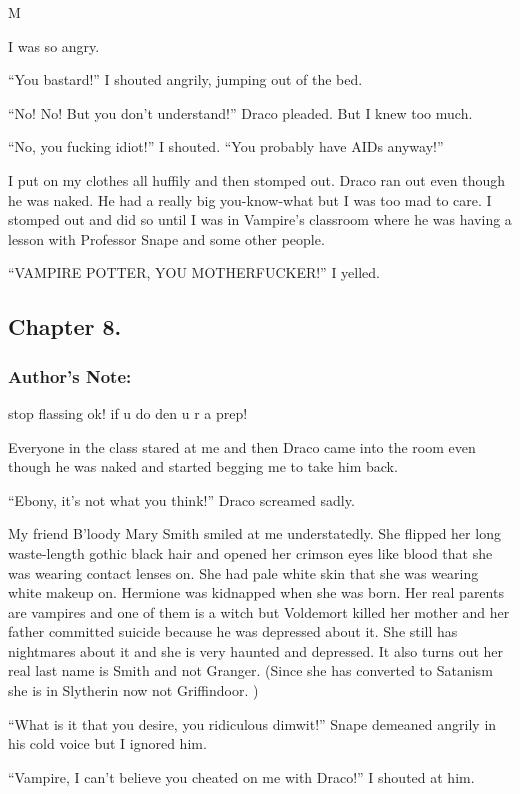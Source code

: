 M\documentclass{article}
\begin{document}
I was so angry.

“You bastard!” I shouted angrily, jumping out of the bed.

“No! No! But you don’t understand!” Draco pleaded. But I knew too much.

“No, you fucking idiot!” I shouted. “You probably have AIDs anyway!”

I put on my clothes all huffily and then stomped out. Draco ran out even though he was naked. He had a really big you-know-what but I was too mad to care. I stomped out and did so until I was in Vampire’s classroom where he was having a lesson with Professor Snape and some other people.

“VAMPIRE POTTER, YOU MOTHERFUCKER!” I yelled.

\clearpage\nolinenumbers
\subsection*{Chapter 8.}

\subsubsection*{Author's Note: }stop flassing ok! if u do den u r a prep!

\textbreak
\linenumbers\resetlinenumber

Everyone in the class stared at me and then Draco came into the room even though he was naked and started begging me to take him back.

“Ebony, it’s not what you think!” Draco screamed sadly.

My friend B’loody Mary Smith smiled at me understatedly. She flipped her long waste-length gothic black hair and opened her crimson eyes like blood that she was wearing contact lenses on. She had pale white skin that she was wearing white makeup on. Hermione was kidnapped when she was born. Her real parents are vampires and one of them is a witch but Voldemort killed her mother and her father committed suicide because he was depressed about it. She still has nightmares about it and she is very haunted and depressed. It also turns out her real last name is Smith and not Granger. (Since she has converted to Satanism she is in Slytherin now not Griffindoor. )

“What is it that you desire, you ridiculous dimwit!” Snape demeaned angrily in his cold voice but I ignored him.

“Vampire, I can’t believe you cheated on me with Draco!” I shouted at him.
\end{document}
